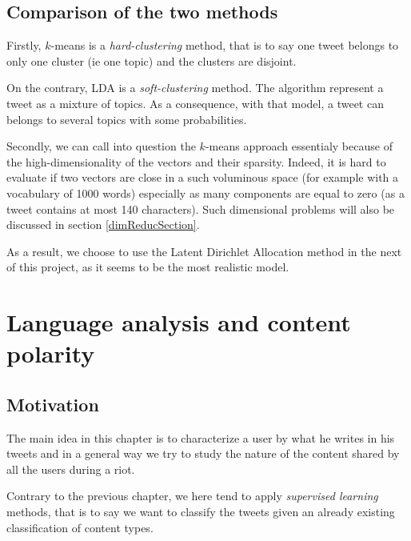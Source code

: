 \documentclass[a4paper,twoside,12pt,openright]{report}
\begin{document}
\newpage


\section{Comparison of the two methods}

Firstly, $k$-means is a \emph{hard-clustering} method, that is to say one tweet belongs to only one cluster (ie one topic) and the clusters are disjoint. 

On the contrary, LDA is a \emph{soft-clustering} method. The algorithm represent a tweet as a mixture of topics. As a consequence, with that model, a tweet can belongs to several topics with some probabilities.

Secondly, we can call into question the $k$-means approach essentialy because of the high-dimensionality of the vectors and their sparsity. Indeed, it is hard to evaluate if two vectors are close in a such voluminous space (for example with a vocabulary of 1000 words) especially as many components are equal to zero (as a tweet contains at most 140 characters).  Such dimensional problems will also be discussed in section \ref{dimReducSection}.

As a result, we choose to use the Latent Dirichlet Allocation method in the next of this project, as it seems to be the most realistic model.



\chapter{Language analysis and content polarity}
\section{Motivation}
The main idea in this chapter is to characterize a user by what he writes in his tweets and in a general way we try to study the nature of the content shared by all the users during a riot.

Contrary to the previous chapter, we here tend to apply \emph{supervised learning} methods, that is to say we want to classify the tweets given an already existing classification of content types.
\end{document}
